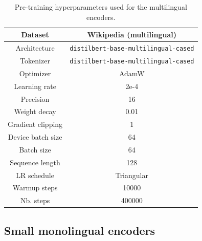 \begin{appendices}
\begin{table}[H]
\centering
\small
\begin{tabular}{c|c}
\toprule
Dataset & Wikipedia (multilingual)  \\ \hline
Architecture & \texttt{distilbert-base-multilingual-cased} \\ \hline
Tokenizer & \texttt{distilbert-base-multilingual-cased} \\ \hline
Optimizer         & AdamW      \\ \hline
Learning rate     & 2e-4       \\ \hline
Precision  & 16 \\ \hline
Weight decay      & 0.01       \\ \hline
Gradient clipping & 1          \\ \hline
Device batch size        & 64         \\ \hline
Batch size        & 64        \\ \hline
Sequence length   & 128        \\ \hline
LR schedule       & Triangular \\ \hline
Warmup steps      & 10000      \\ \hline
Nb. steps         & 400000        \\ \bottomrule
\end{tabular}
\caption{Pre-training hyperparameters used for the multilingual encoders.}
\end{table}

\subsection{Small monolingual encoders}
\label{app:s_train_mono_enc}



\end{appendices}
